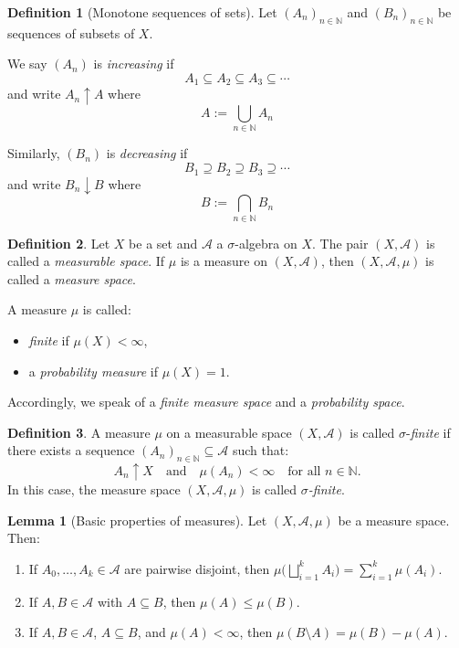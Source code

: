 \documentclass[12pt]{article}
\theoremstyle{definition}
\newtheorem{definition}{Definition}[section]
\newtheorem{lemma}[theorem]{Lemma}
\begin{document}
\medskip
\begin{definition}[Monotone sequences of sets]
Let \((A_n)_{n \in \mathbb{N}}\) and \((B_n)_{n \in \mathbb{N}}\) be sequences of subsets of \(X\).

We say \((A_n)\) is \emph{increasing} if 
\[
A_1 \subseteq A_2 \subseteq A_3 \subseteq \cdots
\]
and write \(A_n \uparrow A\) where
\[
A := \bigcup_{n \in \mathbb{N}} A_n
\]

Similarly, \((B_n)\) is \emph{decreasing} if
\[
B_1 \supseteq B_2 \supseteq B_3 \supseteq \cdots
\]
and write \(B_n \downarrow B\) where
\[
B := \bigcap_{n \in \mathbb{N}} B_n
\]
\end{definition}


\medskip
\begin{definition}
Let \(X\) be a set and \(\mathcal{A}\) a \(\sigma\)-algebra on \(X\). The pair \((X, \mathcal{A})\) is called a \emph{measurable space}.  
If \(\mu\) is a measure on \((X, \mathcal{A})\), then \((X, \mathcal{A}, \mu)\) is called a \emph{measure space}.

\medskip

A measure \(\mu\) is called:
\begin{itemize}
  \item \emph{finite} if \(\mu(X) < \infty\),
  \item a \emph{probability measure} if \(\mu(X) = 1\).
\end{itemize}

Accordingly, we speak of a \emph{finite measure space} and a \emph{probability space}.
\end{definition}


\medskip
\begin{definition}
A measure \(\mu\) on a measurable space \((X, \mathcal{A})\) is called \(\sigma\)-\emph{finite} if there exists a sequence \((A_n)_{n \in \mathbb{N}} \subseteq \mathcal{A}\) such that:
\[
A_n \uparrow X \quad \text{and} \quad \mu(A_n) < \infty \quad \text{for all } n \in \mathbb{N}.
\]
In this case, the measure space \((X, \mathcal{A}, \mu)\) is called \emph{\(\sigma\)-finite}.
\end{definition}


\medskip
\begin{lemma}[Basic properties of measures]
Let \((X,\mathcal{A},\mu)\) be a measure space. Then:
\renewcommand{\labelenumi}{(\roman{enumi})}
\begin{enumerate}
    \item If \(A_0, \ldots, A_k \in \mathcal{A}\) are pairwise disjoint, then \(\mu\big(\bigsqcup_{i=1}^k A_i\big) = \sum_{i=1}^k \mu(A_i)\).
    \item If \(A, B \in \mathcal{A}\) with \(A \subseteq B\), then \(\mu(A) \leq \mu(B)\).
    \item If \(A, B \in \mathcal{A}\), \(A \subseteq B\), and \(\mu(A) < \infty\), then \(\mu(B \setminus A) = \mu(B) - \mu(A)\).
\end{enumerate}
\end{lemma}
\end{document}
